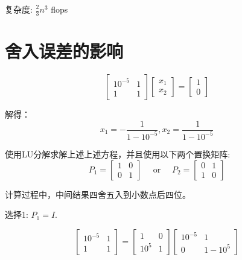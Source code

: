 复杂度: $ \frac{2}{3} n^{3} $ flops



\section{舍入误差的影响}

\begin{example}
    \begin{equation} \left[\begin{array}{cc}10^{-5} & 1 \\ 1 & 1\end{array}\right]\left[\begin{array}{l}x_{1} \\ x_{2}\end{array}\right]=\left[\begin{array}{l}1 \\ 0\end{array}\right] \end{equation}

    解得： \begin{equation} x_{1}=-\frac{1}{1-10^{-5}}, x_{2}=\frac{1}{1-10^{-5}} \end{equation}

    使用LU分解求解上述上述方程，并且使用以下两个置换矩阵:
    \begin{equation}
        P_{1}=\left[\begin{array}{ll}
                1 & 0 \\
                0 & 1
            \end{array}\right] \quad \text { or } \quad P_{2}=\left[\begin{array}{ll}
                0 & 1 \\
                1 & 0
            \end{array}\right]
    \end{equation}

    计算过程中，中间结果四舍五入到小数点后四位。

    选择1: $  P_{1}=I $.

    \begin{equation}
        \left[\begin{array}{cc}
                10^{-5} & 1 \\
                1       & 1
            \end{array}\right]=\left[\begin{array}{cc}
                1      & 0 \\
                10^{5} & 1
            \end{array}\right]\left[\begin{array}{cc}
                10^{-5} & 1        \\
                0       & 1-10^{5}
            \end{array}\right]
    \end{equation}


\end{example}
